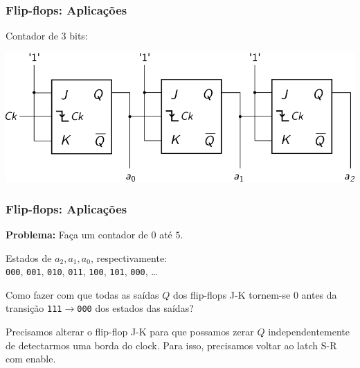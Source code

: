 \documentclass{beamer}
\begin{document}
\begin{frame}
\frametitle{Flip-flops: Aplicações}

Contador de $3$ bits:

\vspace{12pt}

\includegraphics[width=\textwidth]{images/counter}

\end{frame}

\begin{frame}
\frametitle{Flip-flops: Aplicações}

\textbf{Problema:} Faça um contador de $0$ até $5$.

\pause

\vspace{12pt}

Estados de $a_2, a_1, a_0$, respectivamente:\\
\texttt{000}, \texttt{001}, \texttt{010},
\texttt{011}, \texttt{100}, \texttt{101},
\texttt{000}, \ldots

\pause

\vspace{12pt}

Como fazer com que todas as saídas $Q$ dos flip-flops
J-K tornem-se $0$ antes da transição
\texttt{111}$\rightarrow$\texttt{000}
dos estados das saídas?

\pause

\vspace{12pt}

Precisamos alterar o flip-flop J-K para que possamos
zerar $Q$ independentemente de detectarmos uma borda
do clock. Para isso, precisamos voltar ao latch S-R
com enable.

\end{frame}
\end{document}
